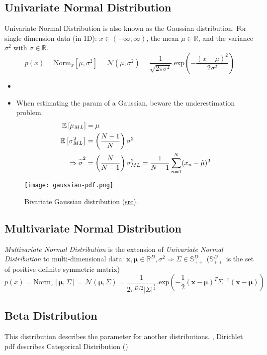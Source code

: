 \subsection{Univariate Normal Distribution}
Univariate Normal Distribution is also known as the Gaussian distribution. For single dimension data (in 1D): $x \in (-\infty, \infty)$, the mean $\mu \in \mathbb{R}$, and the variance $\sigma^2$ with $\sigma \in \mathbb{R}$.
\begin{equation}
	p(x) = \text{Norm}_x\left[\mu, \sigma^2\right] = \mathcal{N}(\mu, \sigma^2) = \frac{1}{\sqrt{2\pi\sigma^2}}.\text{exp}\left(-\frac{(x-\mu)^2}{2\sigma^2}\right)
\end{equation}
\note
\begin{itemize}
	\item {}
	\item When estimating the \ac{param} of a Gaussian, beware the underestimation problem.
	\begin{align*}
		\mathbb{E} \left[ \mu_{ML} \right] &= \mu \\
		\mathbb{E} \left[ \sigma^2_{ML} \right] &= \left(\frac{N-1}{N}\right)\sigma^2 \\
		\Rightarrow \overset{\sim}{\sigma}^2 &= \left(\frac{N}{N-1}\right)\sigma^2_{ML} = \frac{1}{N-1} \sum_{n=1}^{N} (x_n-\hat{\mu})^2
	\end{align*}
\end{itemize}
\begin{figure}[hbt!]
	\centering
	\texttt{[image: gaussian-pdf.png]}
	\caption{Bivariate Gaussian distribution (\href{https://stats.stackexchange.com/questions/102632/plot-two-dimensional-gaussian-density-function-in-matlab}{src}).}
	\label{fig:relation-ai-ml-dl}
\end{figure}

\subsection{Multivariate Normal Distribution}
\textit{Multivariate Normal Distribution} is the extension of \textit{Univariate Normal Distribution} to multi-dimensional data: $\textbf{x}, \boldsymbol{\mu} \in \mathbb{R}^D, \sigma^2 \Rightarrow \Sigma \in \mathbb{S}^D_{++}$ ($\mathbb{S}^D_{++}$ is the set of positive definite symmetric matrix)
\begin{equation}
	p(x) = \text{Norm}_x [\boldsymbol{\mu}, \Sigma] = \mathcal{N}(\boldsymbol{\mu}, \Sigma) = \frac{1}{2\pi^{D/2}| \Sigma|^{\frac{1}{2}}} . \text{exp} \left( -\frac{1}{2} {(\textbf{x} - \boldsymbol{\mu})^T \Sigma^{-1} (\textbf{x} - \boldsymbol{\mu})} \right)
\end{equation}

\subsection{Beta Distribution}
This distribution describes the parameter for another distributions. \Eg, Dirichlet \ac{pdf} describes Categorical Distribution ()